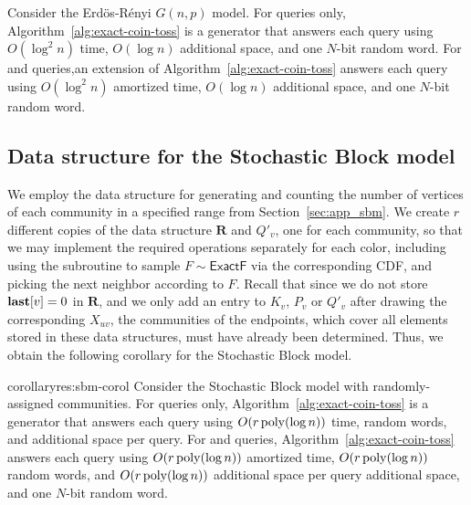 \begin{theorem}
Consider the Erd\"{o}s-R\'{e}nyi $G(n,p)$ model. For  queries only, Algorithm~\ref{alg:exact-coin-toss} is a generator that answers each query using $O(\log^2 n)$ time, $O(\log n)$ additional space, and one $N$-bit random word. For  and  queries,an extension of Algorithm~\ref{alg:exact-coin-toss} answers each query using $O(\log^2 n)$ amortized time, $O(\log n)$ additional space, and one $N$-bit random word.
\end{theorem}

\subsection{Data structure for the Stochastic Block model}\label{sec:det-sbm}

We employ the data structure for generating and counting the number of vertices of each community in a specified range from Section~\ref{sec:app_sbm}. We create $r$ different copies of the data structure $\mathbf{R}$ and $Q'_v$, one for each community, so that we may implement the required operations separately for each color, including using the  subroutine to sample $F\sim\mathsf{ExactF}$ via the corresponding CDF, and picking the next neighbor according to $F$. Recall that since we do not store $\mathbf{last}[v] = 0$ in $\mathbf{R}$, and we only add an entry to $K_v$, $P_v$ or $Q'_v$ after drawing the corresponding $X_{uv}$, the communities of the endpoints, which cover all elements stored in these data structures, must have already been determined. Thus, we obtain the following corollary for the Stochastic Block model.

\begin{restatable}{corollary}{res:sbm-corol}
Consider the Stochastic Block model with randomly-assigned communities. For  queries only, Algorithm~\ref{alg:exact-coin-toss} is a generator that answers each query using $O(r\,\mathrm{poly}(\log n))$ time, random words, and additional space per query. For  and  queries, Algorithm~\ref{alg:exact-coin-toss} answers each query using $O(r\,\mathrm{poly}(\log n))$ amortized time, $O(r\,\mathrm{poly}(\log n))$ random words, and $O(r\,\mathrm{poly}(\log n))$ additional space per query additional space, and one $N$-bit random word.
\end{restatable}

